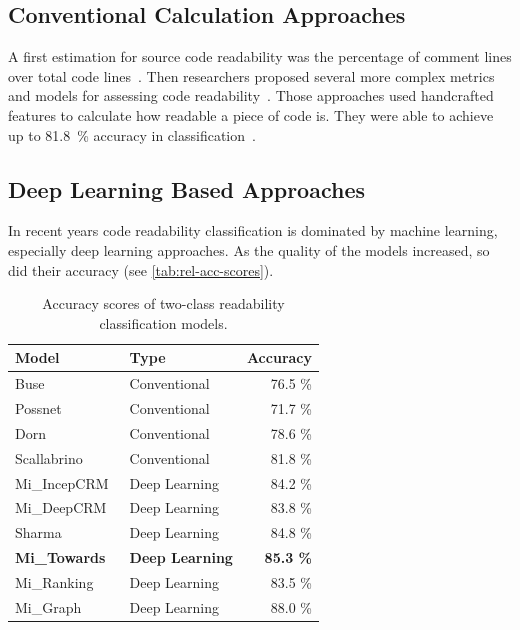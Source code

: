 \documentclass[%
class=scrreprt,
chapterprefix=false,%
open=right,%
twoside=false,%
paper=a4,%
logofile={Logo\_zentral\_farbig\_EN.png},%
thesistype=master,%
UKenglish,%
]{se2thesis}
\theoremstyle{definition}
\begin{document}
	
\subsection{Conventional Calculation Approaches} \label{Classical Calculation Approaches}
	A first estimation for source code readability was the percentage of comment lines over total code lines~\cite{aggarwal2002integrated}. Then researchers proposed several more complex metrics and models for assessing code readability~\cite{buse2009learning, posnett2011simpler, dorn2012general, scalabrino2018comprehensive}.
	Those approaches used handcrafted features to calculate how readable a piece of code is. They were able to achieve up to 81.8~\% accuracy in classification~\cite{scalabrino2018comprehensive}.
	
\subsection{Deep Learning Based Approaches} \label{Deep Learning Based Approaches}
	In recent years code readability classification is dominated by machine learning, especially deep learning approaches. As the quality of the models increased, so did their accuracy (see \autoref{tab:rel-acc-scores}).
	
	\begin{table}[tb]
		\centering
		\caption{Accuracy scores of two-class readability classification models.}
		\label{tab:rel-acc-scores}
		\begin{tabular}{llr}
			\toprule
			Model & Type & Accuracy \\
			\midrule
			Buse~\cite{buse2009learning} & Conventional & 76.5 \% \\
			Possnet~\cite{posnett2011simpler} & Conventional & 71.7 \% \\
			Dorn~\cite{dorn2012general} & Conventional & 78.6 \% \\
			Scallabrino~\cite{scalabrino2018comprehensive} & Conventional & 81.8 \% \\
			Mi\_IncepCRM~\cite{mi2018inception} & Deep Learning & 84.2 \% \\
			Mi\_DeepCRM~\cite{mi2018improving} & Deep Learning & 83.8 \% \\
			Sharma~\cite{sharma2020egan} & Deep Learning & 84.8 \% \\
			\textbf{Mi\_Towards~\cite{mi2022towards}} & \textbf{Deep Learning} & \textbf{85.3 \%} \\
			Mi\_Ranking~\cite{mi2022rank} & Deep Learning & 83.5 \% \\
			Mi\_Graph~\cite{mi2023graph} & Deep Learning & 88.0 \% \\
			\bottomrule
		\end{tabular}
	\end{table}
	
\end{document}
